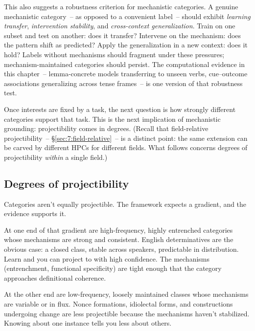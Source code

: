 This also suggests a robustness criterion for mechanistic categories. A genuine mechanistic category~-- as opposed to a convenient label~-- should exhibit \emph{learning transfer}, \emph{intervention stability}, and \emph{cross-context generalization}. Train on one subset and test on another: does it transfer? Intervene on the mechanism: does the pattern shift as predicted? Apply the generalization in a new context: does it hold? Labels without mechanisms should fragment under these pressures; mechanism-maintained categories should persist. The computational evidence in this chapter~-- lemma-concrete models transferring to unseen verbs, cue--outcome associations generalizing across tense frames~-- is one version of that robustness test.

Once interests are fixed by a task, the next question is how strongly different categories support that task. This is the next implication of mechanistic grounding: projectibility comes in degrees. (Recall that field-relative projectibility~-- §\ref{sec:7:field-relative}~-- is a distinct point: the same extension can be carved by different HPCs for different fields. What follows concerns degrees of projectibility \emph{within} a single field.)

\subsection{Degrees of projectibility}
\label{sec:7:degrees-projectibility}

Categories aren't equally projectible. The framework expects a gradient, and the evidence supports it.

At one end of that gradient are high-frequency, highly entrenched categories whose mechanisms are strong and consistent. English determinatives are the obvious case: a closed class, stable across speakers, predictable in distribution. Learn  and you can project to  with high confidence. The mechanisms (entrenchment, functional specificity) are tight enough that the category approaches definitional coherence.

At the other end are low-frequency, loosely maintained classes whose mechanisms are variable or in flux. Nonce formations, idiolectal forms, and constructions undergoing change are less projectible because the mechanisms haven't stabilized. Knowing about one instance tells you less about others.

